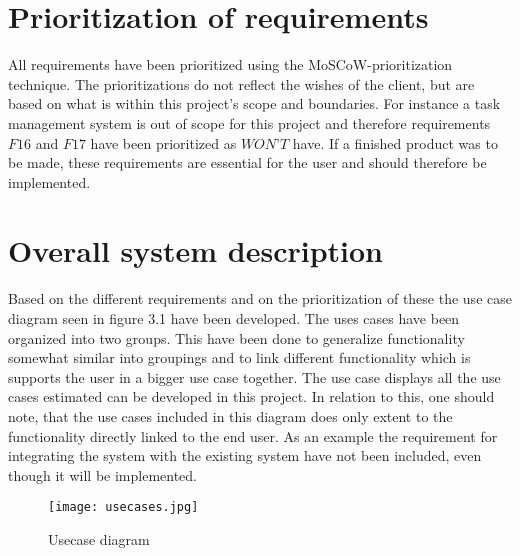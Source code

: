 \section{Prioritization of requirements}
All requirements have been prioritized using the MoSCoW-prioritization technique. The prioritizations do not reflect the wishes of the client,  but are based on what is within this project's scope and boundaries. For instance a task management system is out of scope for this project and therefore requirements $F16$ and $F17$ have been prioritized as $WON’T$ have. If a finished product was to be made, these requirements are essential for the user and should therefore be implemented.
\section{Overall system description}
Based on the different requirements and on the prioritization of these the use case diagram seen in figure 3.1 have been developed. The uses cases have been organized into two groups. This have been done to generalize functionality somewhat similar into groupings and to link different functionality which is supports the user in a bigger use case together. The use case displays all the use cases estimated can be developed in this project. In relation to this, one should note, that the use cases included in this diagram does only extent to the functionality directly linked to the end user. As an example the requirement for integrating the system with the existing system have not been included, even though it will be implemented.
\begin{figure}
\begin{center}
\texttt{[image: usecases.jpg]}
\end{center}
\caption{Usecase diagram}
\end{figure}


